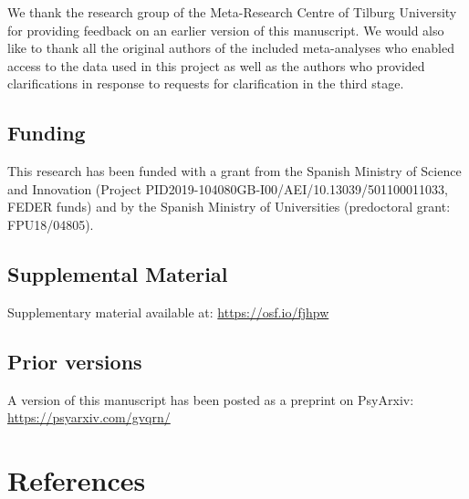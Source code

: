 \documentclass[
  ,man,floatsintext]{apa6}
\begin{document}
We thank the research group of the Meta-Research Centre of Tilburg University for providing feedback on an earlier version of this manuscript. We would also like to thank all the original authors of the included meta-analyses who enabled access to the data used in this project as well as the authors who provided clarifications in response to requests for clarification in the third stage.

\hypertarget{funding}{%
\subsection{Funding}\label{funding}}

This research has been funded with a grant from the Spanish Ministry of Science and Innovation (Project PID2019-104080GB-I00/AEI/10.13039/501100011033, FEDER funds) and by the Spanish Ministry of Universities (predoctoral grant: FPU18/04805).

\hypertarget{supplemental-material}{%
\subsection{Supplemental Material}\label{supplemental-material}}

Supplementary material available at: \url{https://osf.io/fjhpw}

\hypertarget{prior-versions}{%
\subsection{Prior versions}\label{prior-versions}}

A version of this manuscript has been posted as a preprint on PsyArxiv: \url{https://psyarxiv.com/gvqrn/}

\hypertarget{references}{%
\section*{References}\label{references}}
\end{document}
